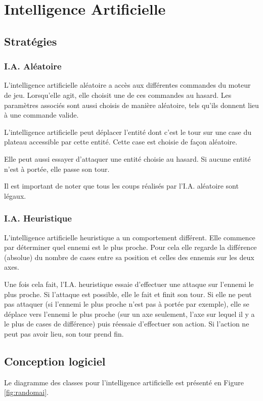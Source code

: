 \documentclass[a4paper,12pt]{article}
\begin{document}
\clearpage
\section{Intelligence Artificielle}


\subsection{Stratégies}
\subsubsection{I.A. Aléatoire}
L'intelligence artificielle aléatoire a accès aux différentes commandes du moteur de jeu. Lorsqu'elle agit, elle choisit une de ces commandes au hasard. Les paramètres associés sont aussi choisis de manière aléatoire, tels qu'ils donnent lieu à une commande valide.

L'intelligence artificielle peut déplacer l'entité dont c'est le tour sur une case du plateau accessible par cette entité. Cette case est choisie de façon aléatoire.

Elle peut aussi essayer d'attaquer une entité choisie au hasard. Si aucune entité n'est à portée, elle passe son tour.

Il est important de noter que tous les coups réalisés par l'I.A. aléatoire sont légaux.

\subsubsection{I.A. Heuristique}
L'intelligence artificielle heuristique a un comportement différent. Elle commence par déterminer quel ennemi est le plus proche. Pour cela elle regarde la différence (absolue) du nombre de cases entre sa position et celles des ennemis sur les deux axes.

Une fois cela fait, l'I.A. heuristique essaie d'effectuer une attaque sur l'ennemi le plus proche. Si l'attaque est possible, elle le fait et finit son tour. Si elle ne peut pas attaquer (si l'ennemi le plus proche n'est pas à portée par exemple), elle se déplace vers l'ennemi le plus proche (sur un axe seulement, l'axe sur lequel il y a le plus de cases de différence) puis réessaie d'effectuer son action. Si l'action ne peut pas avoir lieu, son tour prend fin.

\subsection{Conception logiciel}
Le diagramme des classes pour l'intelligence artificielle est présenté en Figure \ref{fig:randomai}.
\end{document}
